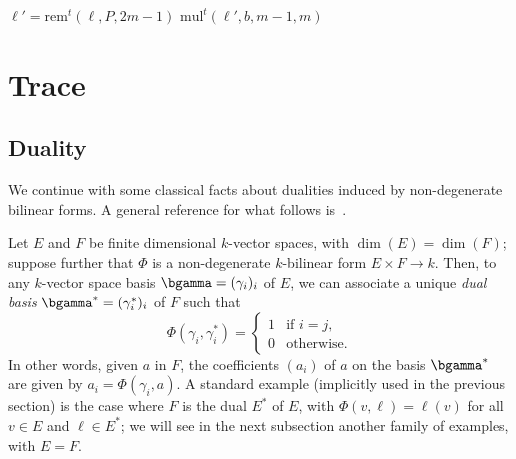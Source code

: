 \documentclass{sig-alternate}
\def\mul {\ensuremath{\mathrm{mul}}}
\def\rem {\ensuremath{\mathrm{rem}}}
\def\mulmod {\ensuremath{\mathrm{mulmod}}}
\newcommand{\ang}[1]{\langle#1\rangle}
\begin{document}

\begin{algorithm}[H]
  \caption{$\mulmod^t(\ell,b,P)$}
  \begin{algorithmic}[1]
    \STATE $\ell' = \rem^t(\ell,P,2m-1)$
    \RETURN $\mul^t(\ell', b, m-1, m)$
  \end{algorithmic}
\end{algorithm}


\section{Trace}


\subsection{Duality}\label{ssec:duality}

We continue with some classical facts about dualities induced by
non-degenerate bilinear forms. A general reference for what follows
is~\cite[Ch.~IX.1.8]{BourbakiAlgCom9}.

Let $E$ and $F$ be finite dimensional $k$-vector spaces, with
$\dim(E)=\dim(F)$; suppose further that $\Phi$ is a non-degenerate
$k$-bilinear form $E\times F \to k$. Then, to any $k$-vector space basis
$\bgamma=(\gamma_i)_i$ of $E$, we can associate a unique \emph{dual basis}
$\bgamma^\ast=(\gamma_i^\ast)_i$ of $F$ such that
\begin{equation}
  \label{eq:dual-basis}
  \Phi(\gamma_i,\gamma^\ast_i) = \begin{cases} 1 &\text{if $i=j$,}\\ 0
    &\text{otherwise}.
  \end{cases}
\end{equation}
In other words, given $a$ in $F$, the coefficients $(a_i)$ of $a$ on
the basis $\bgamma^\ast$ are given by $a_i=\Phi(\gamma_i, a)$. A
standard example (implicitly used in the previous section) is the case
where $F$ is the dual $E^*$ of $E$, with $\Phi(v,\ell)=\ell(v)$ for
all $v\in E$ and $\ell \in E^*$; we will see in the next subsection
another family of examples, with $E=F$.
\end{document}
